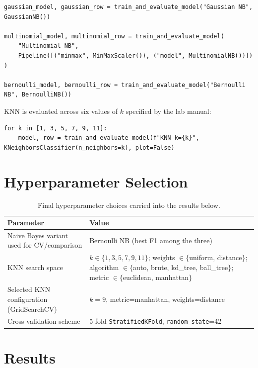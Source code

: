 \documentclass[11pt,a4paper]{article}
\begin{document}
\begin{lstlisting}
gaussian_model, gaussian_row = train_and_evaluate_model("Gaussian NB", GaussianNB())

multinomial_model, multinomial_row = train_and_evaluate_model(
    "Multinomial NB",
    Pipeline([("minmax", MinMaxScaler()), ("model", MultinomialNB())])
)

bernoulli_model, bernoulli_row = train_and_evaluate_model("Bernoulli NB", BernoulliNB())
\end{lstlisting}

KNN is evaluated across six values of $k$ specified by the lab manual:
\begin{lstlisting}
for k in [1, 3, 5, 7, 9, 11]:
    model, row = train_and_evaluate_model(f"KNN k={k}", KNeighborsClassifier(n_neighbors=k), plot=False)
\end{lstlisting}

\section{Hyperparameter Selection}
\begin{table}[h]
\centering
\begin{tabular}{@{}p{4.3cm}p{8.5cm}@{}}
\toprule
Parameter & Value \\
\midrule
Naive Bayes variant used for CV/comparison & Bernoulli NB (best F1 among the three) \\
KNN search space & $k \in \{1,3,5,7,9,11\}$; weights $\in \{$uniform, distance$\}$; algorithm $\in \{$auto, brute, kd\_tree, ball\_tree$\}$; metric $\in \{$euclidean, manhattan$\}$ \\
Selected KNN configuration (GridSearchCV) & $k=9$, metric=manhattan, weights=distance \\
Cross-validation scheme & 5-fold \texttt{StratifiedKFold}, \texttt{random\_state}=42 \\
\bottomrule
\end{tabular}
\caption{Final hyperparameter choices carried into the results below.}
\end{table}

\section{Results}
\end{document}
